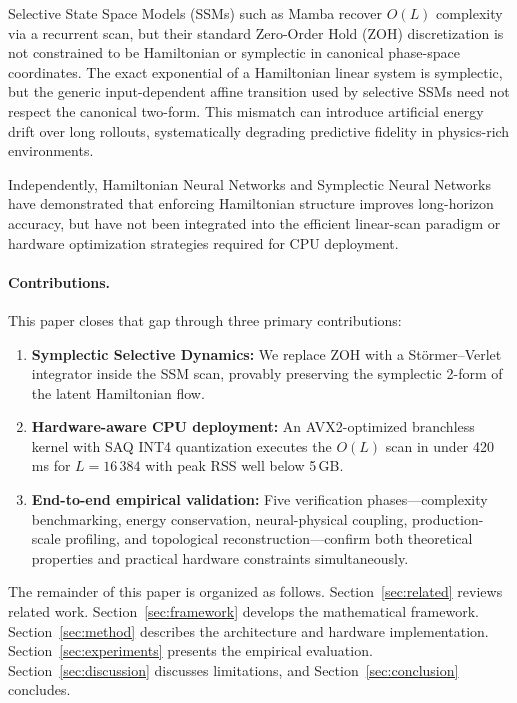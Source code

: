 \documentclass[10pt,twocolumn]{article}
\begin{document}
Selective State Space Models (SSMs) such as Mamba \cite{gu2023mamba} recover
$O(L)$ complexity via a recurrent scan, but their standard
Zero-Order Hold (ZOH) discretization is not constrained to be Hamiltonian or
symplectic in canonical phase-space coordinates.
The exact exponential of a Hamiltonian linear system is symplectic, but the
generic input-dependent affine transition used by selective SSMs need not
respect the canonical two-form.
This mismatch can introduce artificial energy drift over long rollouts,
systematically degrading predictive fidelity in physics-rich environments.

Independently, Hamiltonian Neural Networks \cite{greydanus2019hamiltonian} and
Symplectic Neural Networks \cite{chen2019symplectic} have demonstrated
that enforcing Hamiltonian structure improves long-horizon accuracy, but
have not been integrated into the efficient linear-scan paradigm or hardware
optimization strategies required for CPU deployment.

\paragraph{Contributions.} This paper closes that gap through
three primary contributions:
\begin{enumerate}
  \item \textbf{Symplectic Selective Dynamics:} We replace ZOH with a
        St\"{o}rmer--Verlet integrator inside the SSM scan, provably
        preserving the symplectic 2-form of the latent Hamiltonian flow.
  \item \textbf{Hardware-aware CPU deployment:} An AVX2-optimized
        branchless kernel with SAQ INT4 quantization executes the
        $O(L)$ scan in under 420\,ms for $L=16\,384$ with
        peak RSS well below 5\,GB.
  \item \textbf{End-to-end empirical validation:} Five verification
        phases---complexity benchmarking, energy conservation, neural-physical
        coupling, production-scale profiling, and topological
        reconstruction---confirm both theoretical properties and
        practical hardware constraints simultaneously.
\end{enumerate}

The remainder of this paper is organized as follows.
Section~\ref{sec:related} reviews related work.
Section~\ref{sec:framework} develops the mathematical framework.
Section~\ref{sec:method} describes the architecture and hardware
implementation.
Section~\ref{sec:experiments} presents the empirical evaluation.
Section~\ref{sec:discussion} discusses limitations, and
Section~\ref{sec:conclusion} concludes.
\end{document}
